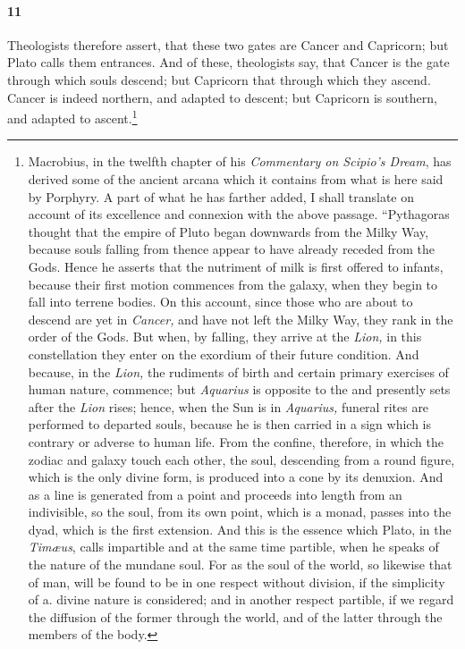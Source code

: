 \documentclass[12pt]{article}
\begin{document}
\paragraph{11} Theologists therefore assert, that these two gates are Cancer
and Capricorn; but Plato calls them entrances. And of these, theologists say,
that Cancer is the gate through which souls descend; but Capricorn that through
which they ascend. Cancer is indeed northern, and adapted to descent; but
Capricorn is southern, and adapted to ascent.\footnote{Macrobius, in the
twelfth chapter of his \textit{Commentary on Scipio's Dream}, has derived some of the
ancient arcana which it contains from what is here said by Porphyry. A part of
what he has farther added, I shall translate on account of its excellence and
connexion with the above passage. ``Pythagoras thought that the empire of Pluto
began downwards from the Milky Way, because souls falling from thence appear to
have already receded from the Gods. Hence he asserts that the nutriment of milk
is first offered to infants, because their first motion commences from the
galaxy, when they begin to fall into terrene bodies. On this account, since
those who are about to descend are yet in \textit{Cancer,} and have not left
the Milky Way, they rank in the order of the Gods. But when, by falling, they
arrive at the \textit{Lion,} in this constellation they enter on the exordium
of their future condition. And because, in the \textit{Lion,} the rudiments of
birth and certain primary exercises of human nature, commence; but
\textit{Aquarius} is opposite to the and presently sets after the \textit{Lion}
rises; hence, when the Sun is in \textit{Aquarius,} funeral rites are performed
to departed souls, because he is then carried in a sign which is contrary or
adverse to human life. From the confine, therefore, in which the zodiac and
galaxy touch each other, the soul, descending from a round figure, which is the
only divine form, is produced into a cone by its denuxion. And as a line is
generated from a point and proceeds into length from an indivisible, so the
soul, from its own point, which is a monad, passes into the dyad, which is the
first extension. And this is the essence which Plato, in the \textit{Tim{\ae}us}, calls
impartible and at the same time partible, when he speaks of the nature of the
mundane soul. For as the soul of the world, so likewise that of man, will be
found to be in one respect without division, if the simplicity of a. divine
nature is considered; and in another respect partible, if we regard the
diffusion of the former through the world, and of the latter through the
members of the body.

}
\end{document}
